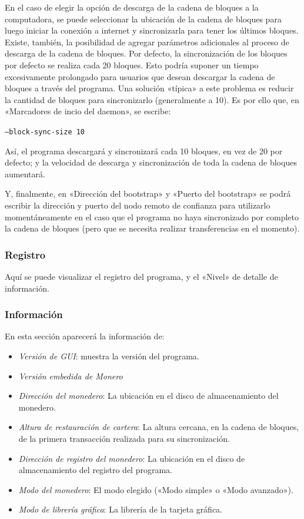 \documentclass[12pt,a4paper,twoside]{book}
\begin{document}
En el caso de elegir la opción de descarga de la cadena de bloques a la computadora, se puede seleccionar la ubicación de la cadena de bloques para luego iniciar la conexión a internet y sincronizarla para tener los últimos bloques. Existe, también, la posibilidad de agregar parámetros adicionales al proceso de descarga de la cadena de bloques. Por defecto, la sincronización de los bloques por defecto se realiza cada 20 bloques. Esto podría suponer un tiempo excesivamente prolongado para usuarios que desean descargar la cadena de bloques a través del programa. Una solución «típica» a este problema es reducir la cantidad de bloques para sincronizarlo (generalmente a 10). Es por ello que, en «Marcadores de incio del daemon», se escribe:

\begin{center}
\texttt{--block-sync-size 10}
\end{center}

Así, el programa descargará y sincronizará cada 10 bloques, en vez de 20 por defecto; y la velocidad de descarga y sincronización de toda la cadena de bloques aumentará.

Y, finalmente, en «Dirección del bootstrap» y «Puerto del bootstrap» se podrá escribir la dirección y puerto del nodo remoto de confianza para utilizarlo momentáneamente en el caso que el programa no haya sincronizado por completo la cadena de bloques (pero que se necesita realizar transferencias en el momento).

\subsubsection{Registro}
Aquí se puede visualizar el registro del programa, y el «Nivel» de detalle de información.

\subsubsection{Información}
En esta sección aparecerá la información de:

\begin{itemize}
\item \textit{Versión de GUI}: muestra la versión del programa.
\item \textit{Versión embedida de Monero}
\item \textit{Dirección del monedero}: La ubicación en el disco de almacenamiento del monedero.
\item \textit{Altura de restauración de cartera}: La altura cercana, en la cadena de bloques, de la primera transacción realizada para su sincronización.
\item \textit{Dirección de registro del monedero}: La ubicación en el disco de almacenamiento del registro del programa.
\item \textit{Modo del monedero}: El modo elegido («Modo simple» o «Modo avanzado»).
\item \textit{Modo de librería gráfica}: La librería de la tarjeta gráfica.
\end{itemize}
\end{document}
